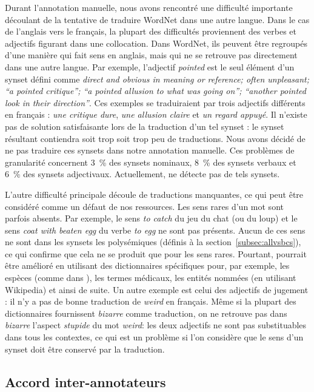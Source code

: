 Durant l'annotation manuelle, nous avons rencontré une difficulté importante découlant de la tentative de traduire WordNet dans une autre langue. Dans le cas de l'anglais vers le français, la plupart des difficultés proviennent des verbes et adjectifs figurant dans une collocation. Dans WordNet, ils peuvent être regroupés d'une manière qui fait sens en anglais, mais qui ne se retrouve pas directement dans une autre langue. Par exemple, l'adjectif \textit{pointed} est le seul élément d'un synset défini comme \textit{direct and obvious in meaning or reference; often unpleasant; ``a pointed critique''; ``a pointed allusion to what was going on''; ``another pointed look in their direction''}. Ces exemples se traduiraient par trois adjectifs différents en français : \textit{une critique dure}, \textit{une allusion claire} et \textit{un regard appuyé}. Il n'existe pas de solution satisfaisante lors de la traduction d'un tel synset : le synset résultant contiendra soit trop soit trop peu de traductions. Nous avons décidé de ne pas traduire ces synsets dans notre annotation manuelle. Ces problèmes de granularité concernent 3~\% des synsets nominaux, 8~\% des synsets verbaux et 6~\% des synsets adjectivaux. Actuellement, \newjaws{} ne détecte pas de tels synsets. 

L'autre difficulté principale découle de traductions manquantes, ce qui peut être considéré comme un défaut de nos ressources. Les sens rares d'un mot sont parfois absents. Par exemple, le sens \textit{to catch} du jeu du chat (ou du loup) et le sens \textit{coat with beaten egg} du verbe \textit{to egg} ne sont pas présents. Aucun de ces sens ne sont dans les synsets les polysémiques (définis à la section~\ref{subsec:allvsbcs}), ce qui confirme que cela ne se produit que pour les sens rares. Pourtant, \newjaws{} pourrait être amélioré en utilisant des dictionnaires spécifiques pour, par exemple, les espèces (comme dans \cite{sagot2008construction}), les termes médicaux, les entités nommées (en utilisant Wikipedia) et ainsi de suite. Un autre exemple est celui des adjectifs de jugement : il n'y a pas de bonne traduction de \textit{weird} en français. Même si la plupart des dictionnaires fournissent \textit{bizarre} comme traduction, on ne retrouve pas dans \textit{bizarre} l'aspect \textit{stupide} du mot \textit{weird}: les deux adjectifs ne sont pas substituables dans tous les contextes, ce qui est un problème si l'on considère que le sens d'un synset doit être conservé par la traduction.

\subsection{Accord inter-annotateurs}
\label{subsec:interannotator_agreement}

